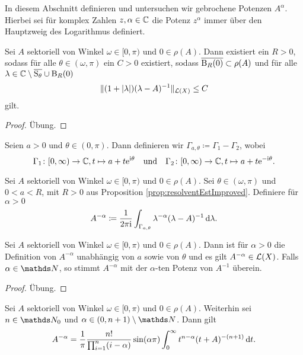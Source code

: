 In diesem Abschnitt definieren und untersuchen wir gebrochene Potenzen $A^\alpha$.
Hierbei sei für komplex Zahlen $z,\alpha \in \mathbb{C}$ die Potenz $z^\alpha$ immer über den Hauptzweig des Logarithmus definiert.

\begin{prop}
  \label{prop:resolventEstImproved}
  Sei $A$ sektoriell von Winkel $\omega \in [0,\pi)$ und $0 \in \rho(A)$.
    Dann existiert ein $R > 0$, sodass für alle $\theta \in (\omega, \pi)$ ein $C > 0$ existiert, sodass $\overline{\mathrm{B}_R(0)} \subset \rho(A)$ und für alle $\lambda \in \mathbb{C} \setminus \overline{\mathrm{S}_\theta} \cup \mathrm{B}_R(0)$
    $$
    \| (1 + |\lambda| ) (\lambda - A)^{-1} \|_{\mathcal{L}(X)} \leq C
    $$
    gilt.
\end{prop}

\begin{proof}
  Übung.
\end{proof}

\begin{ntion}
  Seien $a > 0$ und $\theta \in (0,\pi)$.
  Dann definieren wir $\Gamma_{a,\theta} \coloneqq \Gamma_1 - \Gamma_2$, wobei
  $$
    \Gamma_1 \colon [0,\infty) \to \mathbb{C}, t \mapsto a + t\mathrm{e}^{\mathrm{i}\theta} \quad\text{und} \quad
    \Gamma_2 \colon [0,\infty) \to \mathbb{C}, t \mapsto a + t\mathrm{e}^{-\mathrm{i}\theta}.
  $$
\end{ntion}

\begin{defn}
  Sei $A$ sektoriell von Winkel $\omega \in [0,\pi)$ und $0 \in \rho(A)$.
  Sei $\theta \in (\omega,\pi)$ und $0 < a < R$, mit $R > 0$ aus Proposition \ref{prop:resolventEstImproved}.
  Definiere für $\alpha > 0$
  $$
  A^{-\alpha} \coloneqq \frac{1}{2\pi \mathrm{i}} \int_{\Gamma_{a,\theta}} \lambda^{-\alpha} (\lambda - A)^{-1} \, {\operatorname{d}\!{\lambda}}.
  $$
\end{defn}

\begin{prop}
  \label{prop:natPow}
  Sei $A$ sektoriell von Winkel $\omega \in [0,\pi)$ und $0 \in \rho(A)$.
  Dann ist für $\alpha > 0$ die Definition von $A^{-\alpha}$ unabhängig von $a$ sowie von $\theta$ und es gilt $A^{-\alpha} \in \mathcal{L}(X)$. Falls $\alpha \in \N$, so stimmt $A^{-\alpha}$ mit der $\alpha$-ten Potenz von $A^{-1}$ überein.
\end{prop}

\begin{proof}
  Übung.
\end{proof}

\begin{thm}
  \label{thm:negFracPower}
  Sei $A$ sektoriell von Winkel $\omega \in [0,\pi)$ und $0 \in \rho(A)$.
  Weiterhin sei $n \in \N_0$ und $\alpha \in (0,n+1) \setminus \N$.
  Dann gilt
  $$
  A^{-\alpha} = \frac{1}{\pi} \frac{n!}{\prod_{i = 1}^n(i - \alpha)} \sin(\alpha\pi) \int_0^\infty t^{n - \alpha} ( t + A)^{-(n+1)} \, {\operatorname{d}\!{t}}.
  $$
\end{thm}

